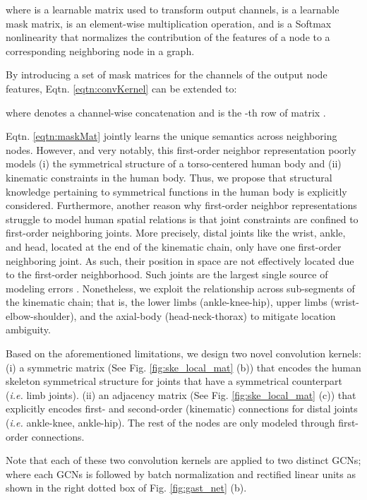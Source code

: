 \documentclass[letterpaper, 10 pt, conference, twoside]{ieeeconf}
\begin{document}
where  is a learnable matrix used to transform output channels,  is a learnable mask matrix,  is an element-wise multiplication operation, and  is a Softmax nonlinearity that normalizes the contribution of the features of a node to a corresponding neighboring node in a graph. 

By introducing a set of mask matrices  for the channels of the output node features, Eqtn. \ref{eqtn:convKernel} can be extended to:

where  denotes a channel-wise concatenation and  is the -th row of matrix .


Eqtn. \ref{eqtn:maskMat} jointly learns the unique semantics across neighboring nodes. However, and very notably, this first-order neighbor representation poorly models (i) the symmetrical structure of a torso-centered human body and (ii) kinematic constraints in the human body. 
Thus, we propose that structural knowledge pertaining to symmetrical functions in the human body is explicitly considered. 
Furthermore, another reason why first-order neighbor representations struggle to model human spatial relations is that joint constraints are confined to first-order neighboring joints. More precisely, distal joints like the wrist, ankle, and head, located at the end of the kinematic chain, only have one first-order neighboring joint. As such, their position in space are not effectively located due to the first-order neighborhood. Such joints are the largest single source of modeling errors \cite{rayat2018exploiting}. Nonetheless, we exploit the relationship across sub-segments of the kinematic chain; that is, the lower limbs (ankle-knee-hip), upper limbs (wrist-elbow-shoulder), and the axial-body (head-neck-thorax) to mitigate  location ambiguity.

Based on the aforementioned limitations, we design two novel convolution kernels: 
(i) a symmetric matrix  (See Fig. \ref{fig:ske_local_mat} (b)) that encodes the human skeleton symmetrical structure for joints that have a symmetrical counterpart (\emph{i.e.} limb joints).
(ii) an adjacency matrix  (See Fig. \ref{fig:ske_local_mat} (c)) that explicitly encodes first- and second-order (kinematic) connections for distal joints (\emph{i.e.} ankle-knee, ankle-hip). The rest of the nodes are only modeled through first-order connections. 

Note that each of these two convolution kernels are applied to two distinct GCNs; where each GCNs is followed by batch normalization and rectified linear units as shown in the right dotted box of Fig. \ref{fig:gast_net} (b).
\end{document}
